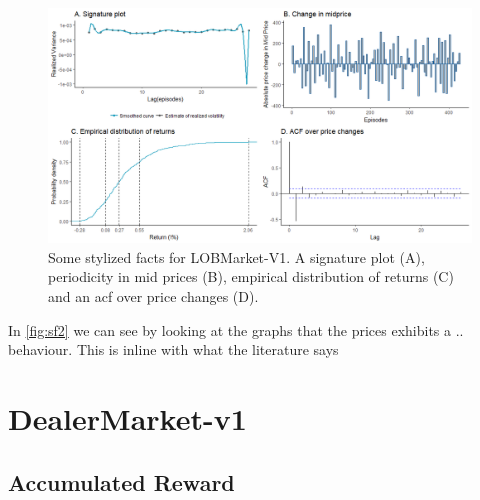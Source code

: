 \documentclass{kththesis}
\theoremstyle{definition}
\begin{document}
\begin{figure}[H]
		\centering
		\includegraphics[scale=.5]{lobv1_sf_multi.png}
		\caption{Some stylized facts for LOBMarket-V1. A signature plot (A), periodicity in mid prices (B), empirical distribution of returns (C) and an acf over price changes (D). }
		\label{fig:sf2}
\end{figure}
In \autoref{fig:sf2} we can see by looking at the graphs that the prices exhibits a .. behaviour. This is inline with what the literature says

\newpage
\section{DealerMarket-v1}

\subsection*{Accumulated Reward}
\end{document}
